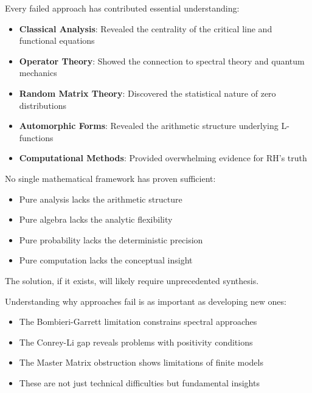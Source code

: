 \begin{lesson}
Every failed approach has contributed essential understanding:
\begin{itemize}
\item \textbf{Classical Analysis}: Revealed the centrality of the critical line and functional equations
\item \textbf{Operator Theory}: Showed the connection to spectral theory and quantum mechanics
\item \textbf{Random Matrix Theory}: Discovered the statistical nature of zero distributions
\item \textbf{Automorphic Forms}: Revealed the arithmetic structure underlying L-functions
\item \textbf{Computational Methods}: Provided overwhelming evidence for RH's truth
\end{itemize}
\end{lesson}

\begin{lesson}
No single mathematical framework has proven sufficient:
\begin{itemize}
\item Pure analysis lacks the arithmetic structure
\item Pure algebra lacks the analytic flexibility
\item Pure probability lacks the deterministic precision
\item Pure computation lacks the conceptual insight
\end{itemize}
The solution, if it exists, will likely require unprecedented synthesis.
\end{lesson}

\begin{lesson}
Understanding why approaches fail is as important as developing new ones:
\begin{itemize}
\item The Bombieri-Garrett limitation constrains spectral approaches
\item The Conrey-Li gap reveals problems with positivity conditions
\item The Master Matrix obstruction shows limitations of finite models
\item These are not just technical difficulties but fundamental insights
\end{itemize}
\end{lesson}

